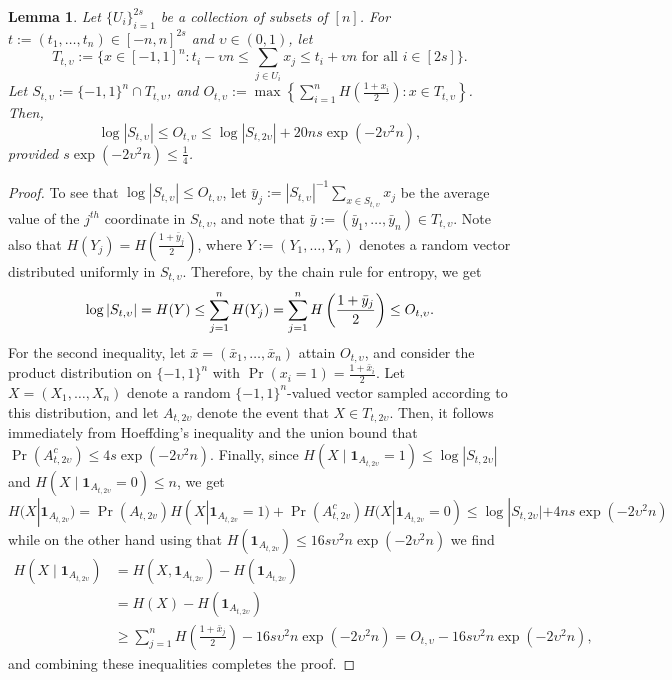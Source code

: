 \documentclass[final, 12pt]{colt2018}
\newcommand{\bone}{\boldsymbol{1}}
\newtheorem{lemma}[theorem]{Lemma}
\theoremstyle{definition}
\theoremstyle{plain}
\begin{document}
\begin{lemma}
\label{lemma:entropyapprox}
Let $\{U_{i}\}_{i=1}^{2s}$ be a collection of subsets of $[n]$.
For $t:=(t_{1},\dots,t_{n})\in[-n,n]^{2s}$ and $\upsilon \in (0,1)$, let 
$$T_{t,\upsilon}:=\{x\in[-1,1]^{n}\colon t_{i}-\upsilon n\leq\sum_{j\in U_{i}}x_{j}\leq t_{i}+\upsilon n\text{ for all } i\in[2s]\}.$$
Let $S_{t,\upsilon}:=\{-1,1\}^{n}\cap T_{t,\upsilon}$, and $O_{t,\upsilon}:=\max\left\{\sum_{i=1}^{n}H\left(\frac{1+x_{i}}{2}\right)\colon x\in T_{t,\upsilon}\right\}$.
Then, $$\log|S_{t,\upsilon}|\leq O_{t,\upsilon}\leq\log|S_{t,2\upsilon}|+20ns\exp\left(-2\upsilon^{2}n\right),$$
provided $s\exp(-2\upsilon^{2}n)\leq\frac{1}{4}$.
\end{lemma}
\begin{proof}
To see that $\log|S_{t,\upsilon}|\leq O_{t,\upsilon}$, let $\bar{y}_{j}:=|S_{t,\upsilon}|^{-1}\sum_{x\in S_{t,\upsilon}}x_{j}$
be the average value of the $j^{th}$ coordinate in $S_{t,\upsilon}$,
and note that $\bar{y}:=(\bar{y}_{1},\dots,\bar{y}_{n})\in T_{t,\upsilon}$.
Note also that $H(Y_{j})=H\left(\frac{1+\bar{y}_{j}}{2}\right)$, where $Y:=(Y_{1},\dots,Y_{n})$
denotes a random vector distributed uniformly in $S_{t,\upsilon}$.
Therefore, by the chain rule for entropy, we get
\[
\log|S_{t,\upsilon}| =H(Y) \leq \sum_{j=1}^{n}H(Y_{j})=\sum_{j=1}^{n}H\left(\frac{1+\bar{y}_j}{2}\right)\leq O_{t,\upsilon}.\\
\]
For the second inequality, let $\bar{x}=(\bar{x}_{1},\dots,\bar{x}_{n})$
attain $O_{t,\upsilon}$, and consider the product distribution on $\{-1,1\}^{n}$
with $\Pr(x_{i}=1)=\frac{1+\bar{x}_{i}}{2}$. Let $X=(X_{1},\dots,X_{n})$ denote
a random $\{-1,1\}^{n}$-valued vector sampled according to this distribution,
and let $A_{t,2\upsilon}$ denote the event that $X\in T_{t,2\upsilon}$.
Then, it follows immediately from Hoeffding's inequality and the union
bound that $\Pr(A_{t,2\upsilon}^{c})\leq 4s\exp(-2\upsilon^{2}n)$. Finally,
since $H(X\mid\boldsymbol{1}_{A_{t,2\upsilon}}=1)\leq\log|S_{t,2\upsilon}|$
and $H(X\mid\boldsymbol{1}_{A_{t,2\upsilon}}=0)\leq n$, we get 
\[ H(X | \bone_{A_{t,2v}}) = \Pr(A_{t,2v})H(X | \bone_{A_{t,2v}} = 1) + \Pr(A_{t,2v}^c) H(X | \bone_{A_{t,2v}} = 0) \le \log|S_{t,2\upsilon}|+4ns\exp\left(-2\upsilon^{2}n\right) \]
while on the other hand using that $H(\bone_{A_{t,2v}}) \le 16s\upsilon^{2}n\exp\left(-2\upsilon^{2}n\right)$ we find
\begin{align*}
 H\left(X\mid\boldsymbol{1}_{A_{t,2\upsilon}}\right)
 & =H\left(X,\boldsymbol{1}_{A_{t,2\upsilon}}\right)-H\left(\boldsymbol{1}_{A_{t,2\upsilon}}\right) \\
 & =H(X)-H\left(\boldsymbol{1}_{A_{t,2\upsilon}}\right)\\
 & \geq\sum_{j=1}^{n}H\left(\frac{1+\bar{x}_{j}}{2}\right)-16s\upsilon^{2}n\exp\left(-2\upsilon^{2}n\right)
  =O_{t,\upsilon}-16s\upsilon^{2}n\exp\left(-2\upsilon^{2}n\right),
\end{align*}
and combining these inequalities completes the proof. 
\end{proof}
\fi
\end{document}
